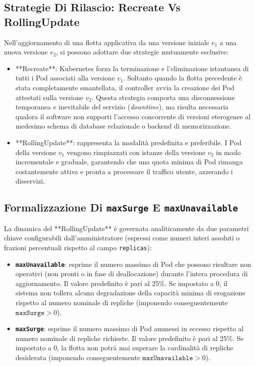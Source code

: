 \documentclass[11pt, a4paper]{article}
\begin{document}
\subsection{Strategie Di Rilascio: Recreate Vs RollingUpdate}

Nell'aggiornamento di una flotta applicativa da una versione iniziale $v_1$ a una nuova versione $v_2$, si possono adottare due strategie mutuamente esclusive:

\begin{itemize}
    \item **Recreate**: Kubernetes forza la terminazione e l'eliminazione istantanea di tutti i Pod associati alla versione $v_1$. Soltanto quando la flotta precedente è stata completamente smantellata, il controller avvia la creazione dei Pod attestati sulla versione $v_2$. Questa strategia comporta una disconnessione temporanea e inevitabile del servizio (\emph{downtime}), ma risulta necessaria qualora il software non supporti l'accesso concorrente di versioni eterogenee al medesimo schema di database relazionale o backend di memorizzazione.
    \item **RollingUpdate**: rappresenta la modalità predefinita e preferibile. I Pod della versione $v_1$ vengono rimpiazzati con istanze della versione $v_2$ in modo incrementale e graduale, garantendo che una quota minima di Pod rimanga costantemente attiva e pronta a processare il traffico utente, azzerando i disservizi.
\end{itemize}

\subsection{Formalizzazione Di \texttt{maxSurge} E \texttt{maxUnavailable}}

La dinamica del **RollingUpdate** è governata analiticamente da due parametri chiave configurabili dall'amministratore (espressi come numeri interi assoluti o frazioni percentuali rispetto al campo \texttt{replicas}):

\begin{itemize}
    \item \textbf{\texttt{maxUnavailable}}: esprime il numero massimo di Pod che possono risultare non operativi (non pronti o in fase di deallocazione) durante l'intera procedura di aggiornamento. Il valore predefinito è pari al 25\%. Se impostato a 0, il sistema non tollera alcuna degradazione della capacità minima di erogazione rispetto al numero nominale di repliche (imponendo conseguentemente $\texttt{maxSurge} > 0$).
    \item \textbf{\texttt{maxSurge}}: esprime il numero massimo di Pod ammessi in eccesso rispetto al numero nominale di repliche richieste. Il valore predefinito è pari al 25\%. Se impostato a 0, la flotta non potrà mai superare la cardinalità di repliche desiderata (imponendo conseguentemente $\texttt{maxUnavailable} > 0$).
\end{itemize}
\end{document}
